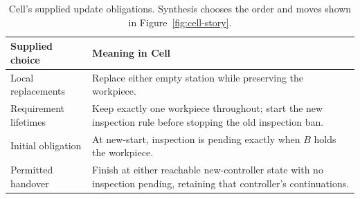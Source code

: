 \begin{table}[!htbp]
\caption{Cell's supplied update obligations. Synthesis chooses the order and moves shown in Figure~\ref{fig:cell-story}.}
\label{tab:contract-map}
\centering\small
\begin{tabular}{@{}>{\raggedright\arraybackslash}p{.24\linewidth}>{\raggedright\arraybackslash}p{.69\linewidth}@{}}\toprule
Supplied choice & Meaning in Cell\\\midrule
Local replacements & Replace either empty station while preserving the workpiece.\\
Requirement lifetimes & Keep exactly one workpiece throughout; start the new inspection rule before stopping the old inspection ban.\\
Initial obligation & At new-start, inspection is pending exactly when $B$ holds the workpiece.\\
Permitted handover & Finish at either reachable new-controller state with no inspection pending, retaining that controller's continuations.\\\bottomrule
\end{tabular}
\end{table}
